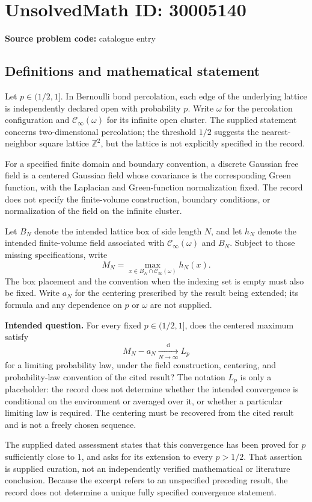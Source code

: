 \documentclass[11pt]{article}
\newcommand{\Z}{\mathbb{Z}}
\begin{document}
\section*{UnsolvedMath ID: 30005140}
\textbf{Source problem code:} catalogue entry
\subsection{Definitions and mathematical statement}
Let \(p\in(1/2,1]\). In Bernoulli bond percolation, each edge of the underlying lattice is independently declared open with probability \(p\). Write \(\omega\) for the percolation configuration and \(\mathcal C_\infty(\omega)\) for its infinite open cluster. The supplied statement concerns two-dimensional percolation; the threshold \(1/2\) suggests the nearest-neighbor square lattice \(\Z^2\), but the lattice is not explicitly specified in the record.

For a specified finite domain and boundary convention, a discrete Gaussian free field is a centered Gaussian field whose covariance is the corresponding Green function, with the Laplacian and Green-function normalization fixed. The record does not specify the finite-volume construction, boundary conditions, or normalization of the field on the infinite cluster.

Let \(B_N\) denote the intended lattice box of side length \(N\), and let \(h_N\) denote the intended finite-volume field associated with \(\mathcal C_\infty(\omega)\) and \(B_N\). Subject to those missing specifications, write
\[
M_N=\max_{x\in B_N\cap\mathcal C_\infty(\omega)}h_N(x).
\]
The box placement and the convention when the indexing set is empty must also be fixed. Write \(a_N\) for the centering prescribed by the result being extended; its formula and any dependence on \(p\) or \(\omega\) are not supplied.

\textbf{Intended question.} For every fixed \(p\in(1/2,1]\), does the centered maximum satisfy
\[
M_N-a_N\xrightarrow[N\to\infty]{\mathrm d}L_p
\]
for a limiting probability law, under the field construction, centering, and probability-law convention of the cited result? The notation \(L_p\) is only a placeholder: the record does not determine whether the intended convergence is conditional on the environment or averaged over it, or whether a particular limiting law is required. The centering must be recovered from the cited result and is not a freely chosen sequence.

The supplied dated assessment states that this convergence has been proved for \(p\) sufficiently close to \(1\), and asks for its extension to every \(p>1/2\). That assertion is supplied curation, not an independently verified mathematical or literature conclusion. Because the excerpt refers to an unspecified preceding result, the record does not determine a unique fully specified convergence statement.
\end{document}
